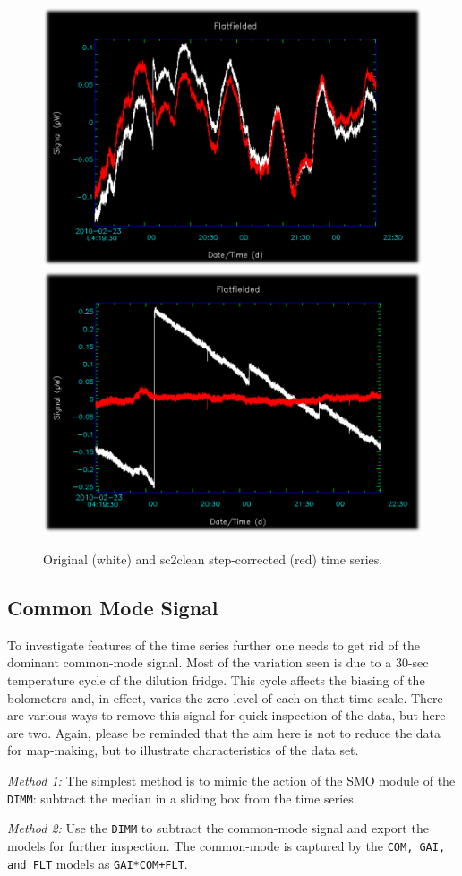 \documentclass[twoside,11pt]{article}
\newcommand{\xlabel}[1]{}
\renewcommand{\_}{\texttt{\symbol{95}}}
\begin{document}
\begin{figure}
\begin{center}
\includegraphics[width=0.45\linewidth]{sc19_sc2clean_13_31}
\hspace{0.03\linewidth}
\includegraphics[width=0.45\linewidth]{sc19_sc2clean_16_33}
\caption{Original (white) and sc2clean step-corrected (red) time series.}
\label{fig:conbslcollapse}
\end{center}
\end{figure}

\subsection{\xlabel{commonmode}Common Mode Signal}
\label{sec:commonmode}

To investigate features of the time series further one needs to get
rid of the dominant common-mode signal. Most of the variation seen is
due to a 30-sec temperature cycle of the dilution fridge. This cycle
affects the biasing of the bolometers and, in effect, varies the
zero-level of each on that time-scale. There are various ways to
remove this signal for quick inspection of the data, but here are two.
Again, please be reminded that the aim here is not to reduce the data
for map-making, but to illustrate characteristics of the data set.

{\sl Method 1:} The simplest method is to mimic the action of the SMO module
of the \texttt{DIMM}: subtract the median in a sliding box from the time
series. 

{\sl Method 2:} Use the \texttt{DIMM} to subtract the common-mode
signal and export the models for further inspection. The common-mode
is captured by the \texttt{COM, GAI, and FLT} models as \texttt{GAI*COM+FLT}.
\end{document}
